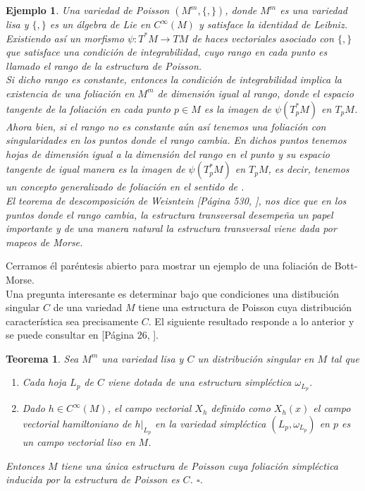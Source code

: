 \documentclass[a4paper,10pt]{book}
\newtheorem{teo}{Teorema}[chapter]
\newtheorem{eje}{Ejemplo}[chapter]
\begin{document}
\begin{eje}
Una variedad de Poisson  $(M^{m},\{ ,\})$, donde $M^{m}$ es una variedad lisa y $\{,\}$ es un \'algebra de Lie en $C^{\infty}(M)$ y satisface la identidad de Leibniz. Existiendo as\'i un morfismo $\psi:T^{*}M\to T M$ de haces vectoriales asociado con $\{ ,\}$ que satisface una condici\'on de integrabilidad, cuyo rango en cada punto es llamado el rango de la estructura de Poisson.\\

Si dicho rango es constante, entonces la condici\'on de integrabilidad implica la existencia de una foliaci\'on en $M^{m}$ de dimensi\'on igual al rango, donde el espacio tangente de la foliaci\'on en cada punto $p\in M$ es la imagen de $\psi(T_{p}^{*}M)$ en $T_{p}M$. Ahora bien, si el rango no es constante a\'un as\'i tenemos una foliaci\'on con singularidades en los puntos donde el rango cambia. En dichos puntos tenemos hojas de dimensi\'on igual a la dimensi\'on del rango en el punto y su espacio tangente de igual manera es la imagen de $\psi(T_{p}^{*}M)$ en $T_{p}M$, es decir, tenemos un concepto generalizado de foliaci\'on en el sentido de \cite{Sussmann73}.\\

El teorema de descomposici\'on de Weisntein [P\'agina 530, \cite{Weinstein83}], nos dice que en los puntos donde el rango cambia, la estructura transversal desempe\~{n}a un papel importante y de una manera natural la estructura transversal viene dada por mapeos de Morse.
\end{eje}

Cerramos \'el par\'entesis abierto para mostrar un ejemplo de una foliaci\'on de Bott-Morse.\\

Una pregunta interesante es determinar bajo que condiciones una distibuci\'on singular $C$ de una variedad $M$ tiene una estructura de Poisson cuya distribuci\'on caracter\'istica sea precisamente $C$. El siguiente resultado responde a lo anterior y se puede consultar en [P\'agina 26, \cite{Vaisman}].

\begin{teo}\label{teoVaisman}
Sea $M^{m}$ una variedad lisa y $C$ un distribuci\'on singular en $M$ tal que 
\begin{enumerate}
    \item Cada hoja $L_{p}$ de $C$ viene dotada de una estructura simpl\'ectica $\omega_{L_{p}}$. 
    \item Dado $h\in C^{\infty}(M)$, el campo vectorial $X_{h}$ definido como $X_{h}(x)$ el campo vectorial hamiltoniano de $h|_{L_{p}}$ en la variedad simpl\'ectica $(L_{p},\omega_{L_{p}})$ en $p$ es un campo vectorial liso en $M$. 
\end{enumerate}
Entonces $M$ tiene una \'unica estructura de Poisson cuya foliaci\'on simpl\'ectica inducida por la estructura de Poisson es $C$. \hfill $\square$.
\end{teo}
\end{document}
